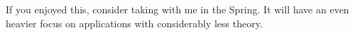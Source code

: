 \begin{frame}[fragile] \frametitle{}

If you enjoyed this, consider taking \textbf{}
with me in the Spring. It will have an even
heavier focus on applications with considerably less theory.

\end{frame}













